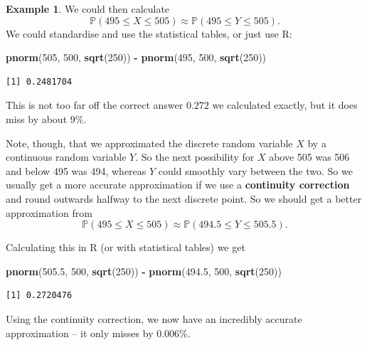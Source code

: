 \documentclass[
  a4paper,
]{book}
\newenvironment{Shaded}{\begin{snugshade}}{\end{snugshade}}
\newcommand{\DecValTok}[1]{\textcolor[rgb]{0.00,0.00,0.81}{#1}}
\newcommand{\FloatTok}[1]{\textcolor[rgb]{0.00,0.00,0.81}{#1}}
\newcommand{\FunctionTok}[1]{\textcolor[rgb]{0.13,0.29,0.53}{\textbf{#1}}}
\newcommand{\NormalTok}[1]{#1}
\newcommand{\SpecialCharTok}[1]{\textcolor[rgb]{0.81,0.36,0.00}{\textbf{#1}}}
\theoremstyle{definition}
\theoremstyle{definition}
\newtheorem{example}{Example}[chapter]
\theoremstyle{definition}
\theoremstyle{definition}
\theoremstyle{remark}
\begin{document}
\begin{example}
We could then calculate
\[ \mathbb P(495 \leq X \leq 505) \approx \mathbb P(495 \leq Y \leq 505) . \]
We could standardise and use the statistical tables, or just use R:

\begin{Shaded}
\begin{Highlighting}[]
\FunctionTok{pnorm}\NormalTok{(}\DecValTok{505}\NormalTok{, }\DecValTok{500}\NormalTok{, }\FunctionTok{sqrt}\NormalTok{(}\DecValTok{250}\NormalTok{)) }\SpecialCharTok{{-}} \FunctionTok{pnorm}\NormalTok{(}\DecValTok{495}\NormalTok{, }\DecValTok{500}\NormalTok{, }\FunctionTok{sqrt}\NormalTok{(}\DecValTok{250}\NormalTok{))}
\end{Highlighting}
\end{Shaded}

\begin{verbatim}
[1] 0.2481704
\end{verbatim}

This is not too far off the correct answer \(0.272\) we calculated exactly, but it does miss by about 9\%.

Note, though, that we approximated the discrete random variable \(X\) by a continuous random variable \(Y\). So the next possibility for \(X\) above 505 was 506 and below 495 was 494, whereas \(Y\) could smoothly vary between the two. So we usually get a more accurate approximation if we use a \textbf{continuity correction} and round outwards halfway to the next discrete point. So we should get a better approximation from
\[ \mathbb P(495 \leq X \leq 505) \approx \mathbb P(494.5 \leq Y \leq 505.5) . \]

Calculating this in R (or with statistical tables) we get

\begin{Shaded}
\begin{Highlighting}[]
\FunctionTok{pnorm}\NormalTok{(}\FloatTok{505.5}\NormalTok{, }\DecValTok{500}\NormalTok{, }\FunctionTok{sqrt}\NormalTok{(}\DecValTok{250}\NormalTok{)) }\SpecialCharTok{{-}} \FunctionTok{pnorm}\NormalTok{(}\FloatTok{494.5}\NormalTok{, }\DecValTok{500}\NormalTok{, }\FunctionTok{sqrt}\NormalTok{(}\DecValTok{250}\NormalTok{))}
\end{Highlighting}
\end{Shaded}

\begin{verbatim}
[1] 0.2720476
\end{verbatim}

Using the continuity correction, we now have an incredibly accurate approximation -- it only misses by 0.006\%.
\end{example}
\end{document}
